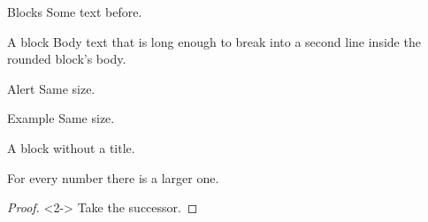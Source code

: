 \documentclass{beamer}
\begin{document}
\begin{frame}{Blocks}
Some text before.
\begin{block}{A block}
Body text that is long enough to break into a second line inside the rounded block's body.
\end{block}
\begin{alertblock}{Alert}
Same size.
\end{alertblock}
\begin{exampleblock}{Example}
Same size.
\end{exampleblock}
\end{frame}
\begin{frame}
\begin{block}{}
A block without a title.
\end{block}
\begin{theorem}[Main]
For every number there is a larger one.
\end{theorem}
\begin{proof}<2->
Take the successor.
\end{proof}
\end{frame}
\end{document}
